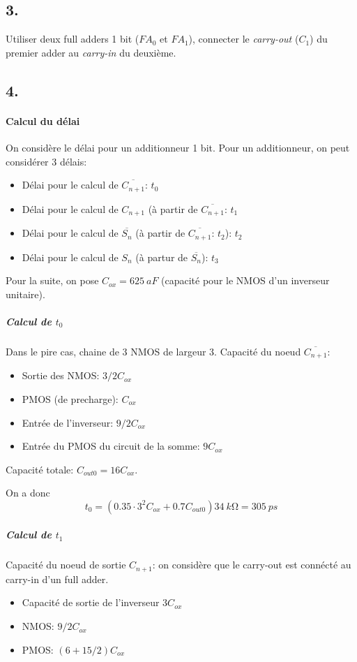 \documentclass[frenchb,DIV=14]{scrartcl}
\begin{document}
\subsection*{3.}

Utiliser deux full adders 1 bit ($FA_0$ et $FA_1$), connecter le 
\emph{carry-out} ($C_1$) du premier adder au \emph{carry-in} du deuxième. 

\subsection*{4.}

\paragraph{Calcul du délai}

On considère le délai pour un additionneur 1 bit.
Pour un additionneur, on peut considérer 3 délais:
\begin{itemize}
    \item Délai pour le calcul de $\overline{C_{n+1}}$: $t_0$
    \item Délai pour le calcul de $C_{n+1}$ (à partir de $\overline{C_{n+1}}$: $t_1$
    \item Délai pour le calcul de $\overline{S_n}$ (à partir de $\overline{C_{n+1}}$: $t_2$): $t_2$
    \item Délai pour le calcul de $S_n$ (à partur de $\overline{S_n}$): $t_3$
\end{itemize}

Pour la suite, on pose $C_{ox} = \SI{625}{aF}$ (capacité pour le NMOS d'un inverseur unitaire).

\subparagraph{Calcul de $t_0$}
Dans le pire cas, chaine de 3 NMOS de largeur 3.
Capacité du noeud $\overline{C_{n+1}}$:
\begin{itemize}
\item Sortie des NMOS: $3/2 C_{ox}$
\item PMOS (de precharge): $C_{ox}$
\item Entrée de l'inverseur: $9/2 C_{ox}$
\item Entrée du PMOS du circuit de la somme: $9 C_{ox}$
\end{itemize}

Capacité totale: $C_{out0} = 16 C_{ox}$.

On a donc
\[t_0 = (0.35\cdot 3^2 C_{ox} + 0.7 C_{out0})\SI{34}{k\ohm} = \SI{305}{ps}\]

\subparagraph{Calcul de $t_1$}
Capacité du noeud de sortie $C_{n+1}$: on considère que le carry-out est
connécté au carry-in d'un full adder.
\begin{itemize}
\item Capacité de sortie de l'inverseur $3C_{ox}$
\item NMOS: $9/2 C_{ox}$
\item PMOS: $(6 + 15/2) C_{ox}$
\end{itemize}
\end{document}
